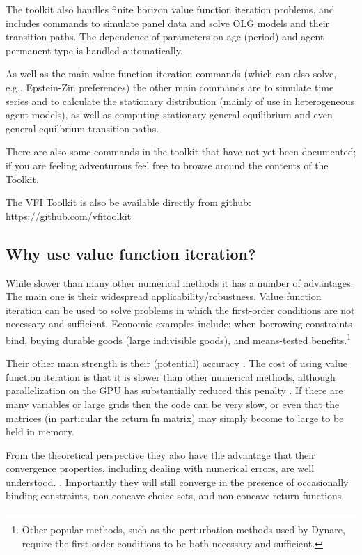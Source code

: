 \documentclass[11pt,fleqn]{article}
\begin{document}
The toolkit also handles finite horizon value function iteration problems, and includes commands to simulate panel data and solve OLG models and their transition paths. The dependence of parameters on age (period) and agent permanent-type is handled automatically.

As well as the main value function iteration commands (which can also solve, e.g., Epstein-Zin preferences) the other main commands are to simulate time series and to calculate the stationary distribution (mainly of use in heterogeneous agent models), as well as computing stationary general equilibrium and even general equilbrium transition paths.

There are also some commands in the toolkit that have not yet been documented; if you are feeling adventurous feel free to browse around the contents of the Toolkit.

The VFI Toolkit is also be available directly from github: \\
\href{https://github.com/vfitoolkit}{https://github.com/vfitoolkit}

\subsection{Why use value function iteration?}
While slower than many other numerical methods it has a number of advantages. The main one is their widespread applicability/robustness. Value function iteration can be used to solve problems in which the first-order conditions are not necessary and sufficient. Economic examples include: when borrowing
constraints bind, buying durable goods (large indivisible goods), and means-tested benefits.\footnote{Other popular methods, such as the perturbation methods used by Dynare, require the first-order conditions to be both necessary and sufficient.}

Their other main strength is their (potential) accuracy \citep*{AruobaFernandezVillaverdeRubioRamirez2006}. The cost of using value function iteration is that it is slower than other numerical methods, although parallelization on the GPU has substantially reduced this penalty \citep*{AldrichFernandezVillaverdeGallantRubioRamirez2011}. If there are many variables or large grids then the code can be very slow, or even that the matrices (in particular the return fn matrix) may simply become to large to be held in memory.

From the theoretical perspective they also have the advantage that their convergence properties, including dealing with numerical errors, are well understood. \citep*{Bertsekas1976, Whitt1978, KirkbyVFIErrors}. Importantly they will still converge in the presence of occasionally binding constraints, non-concave choice sets, and non-concave return functions.
\end{document}
